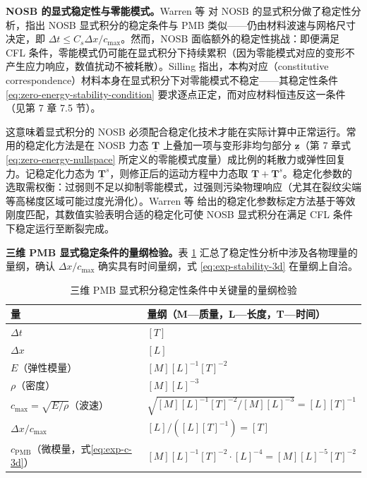 \textbf{NOSB 的显式稳定性与零能模式。}Warren 等 \cite{Warren2009} 对 NOSB 的显式积分做了稳定性分析，指出 NOSB 显式积分的稳定条件与 PMB 类似——仍由材料波速与网格尺寸决定，即 $\Delta t\le C_s\Delta x/c_{\max}$。然而，NOSB 面临额外的稳定性挑战：即便满足 CFL 条件，零能模式仍可能在显式积分下持续累积（因为零能模式对应的变形不产生应力响应，数值扰动不被耗散）。Silling \cite{Silling2017} 指出，本构对应（constitutive correspondence）材料本身在显式积分下对零能模式不稳定——其稳定性条件 \eqref{eq:zero-energy-stability-condition} 要求逐点正定，而对应材料恒违反这一条件（见第 7 章 7.5 节）。

这意味着显式积分的 NOSB 必须配合稳定化技术才能在实际计算中正常运行。常用的稳定化方法是在 NOSB 力态 $\underline{\mathbf{T}}$ 上叠加一项与变形非均匀部分 $\underline{\mathbf{z}}$（第 7 章式 \eqref{eq:zero-energy-nullspace} 所定义的零能模式度量）成比例的耗散力或弹性回复力。记稳定化力态为 $\underline{\mathbf{T}}^{s}$，则修正后的运动方程中力态取 $\underline{\mathbf{T}}+\underline{\mathbf{T}}^{s}$。稳定化参数的选取需权衡：过弱则不足以抑制零能模式，过强则污染物理响应（尤其在裂纹尖端等高梯度区域可能过度光滑化）。Warren 等 \cite{Warren2009} 给出的稳定化参数标定方法基于等效刚度匹配，其数值实验表明合适的稳定化可使 NOSB 显式积分在满足 CFL 条件下稳定运行至断裂完成。

\textbf{三维 PMB 显式稳定条件的量纲检验。}表 \ref{tab:stability-dimensional} 汇总了稳定性分析中涉及各物理量的量纲，确认 $\Delta x/c_{\max}$ 确实具有时间量纲，式 \eqref{eq:exp-stability-3d} 在量纲上自洽。

\begin{table}[htbp]
  \centering
  \small
  \caption{三维 PMB 显式积分稳定性条件中关键量的量纲检验}
  \label{tab:stability-dimensional}
  \begin{tabular}{>{\raggedright\arraybackslash}p{}>{\raggedright\arraybackslash}p{}}
    \toprule
    量 & 量纲（M—质量，L—长度，T—时间） \\
    \midrule
    $\Delta t$ & $[T]$ \\
    $\Delta x$ & $[L]$ \\
    $E$（弹性模量） & $[M][L]^{-1}[T]^{-2}$ \\
    $\rho$（密度） & $[M][L]^{-3}$ \\
    $c_{\max}=\sqrt{E/\rho}$（波速） & $\sqrt{[M][L]^{-1}[T]^{-2}/[M][L]^{-3}}=[L][T]^{-1}$ \\
    $\Delta x/c_{\max}$ & $[L]/([L][T]^{-1})=[T]$ \\
    $c_{\text{PMB}}$（微模量，式\eqref{eq:exp-c-3d}） & $[M][L]^{-1}[T]^{-2}\cdot[L]^{-4}=[M][L]^{-5}[T]^{-2}$ \\
    \bottomrule
  \end{tabular}
\end{table}

